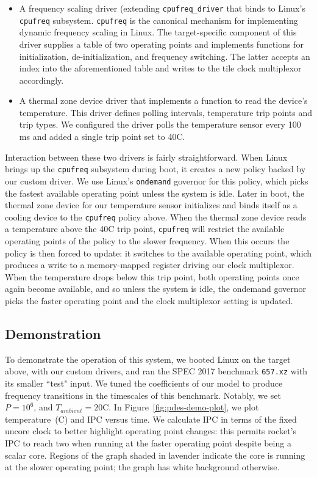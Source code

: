 \begin{itemize}
\item A frequency scaling driver (extending \texttt{cpufreq\_driver} that binds to
Linux's \texttt{cpufreq} subsystem. \texttt{cpufreq} is the canonical mechanism for implementing dynamic
    frequency scaling in Linux. The target-specific component of this
driver supplies a table of two operating points and implements functions for
initialization, de-initialization, and frequency switching. The latter accepts an index
into the aforementioned table and writes to the tile clock multiplexor accordingly.

\item A thermal zone device driver that implements a function to read the
    device's temperature. This driver defines polling intervals, temperature
    trip points and trip types. We configured the driver polls the
    temperature sensor every 100 ms and added a single trip point set to
    40C.

\end{itemize}

Interaction between these two drivers is fairly straightforward.  When Linux
brings up the \texttt{cpufreq} subsystem during boot, it creates a new policy
backed by our custom driver. We use Linux's \texttt{ondemand} governor for this
policy, which picks the fastest available operating point unless the system is
idle. Later in boot, the thermal zone device for our temperature sensor
initializes and binds itself as a cooling device to the \texttt{cpufreq} policy
above. When the thermal zone device reads a temperature above the 40C trip point,
\texttt{cpufreq} will restrict the available operating points of the policy to
the slower frequency. When this occurs the policy is then forced to
update: it switches to the available operating point, which produces a
write to a memory-mapped register driving our clock multiplexor. When the temperature
drops below this trip point, both operating points once again become available, and so
unless the system is idle, the ondemand governor picks the faster operating
point and the clock multiplexor setting is updated.

\subsection{Demonstration}

To demonstrate the operation of this system, we booted Linux on the target
above, with our custom drivers, and ran the SPEC 2017 benchmark
\texttt{657.xz} with its smaller ``test" input. We tuned the coefficients of
our model to produce frequency transitions in the timescales of this benchmark.
Notably, we set $P = 10^6$, and $T_{ambient} = 20$C.
In Figure~\ref{fig:pdes-demo-plot}, we plot temperature~(C) and IPC versus
time. We calculate IPC in terms of the fixed uncore clock to better highlight
operating point changes: this permits rocket's IPC to reach two when running at
the faster operating point despite being a scalar core.  Regions of the graph
shaded in lavender indicate the core is running at the slower operating point;
the graph has white background otherwise.

